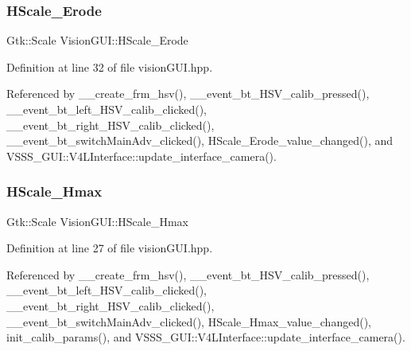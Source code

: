 \mbox{\label{class_vision_g_u_i_ad4bc77416f4e50fa03a7cc7f64a2d78e}} 
\subsubsection{\texorpdfstring{H\+Scale\+\_\+\+Erode}{HScale\_Erode}}
{\footnotesize\ttfamily Gtk\+::\+Scale Vision\+G\+U\+I\+::\+H\+Scale\+\_\+\+Erode}



Definition at line 32 of file vision\+G\+U\+I.\+hpp.



Referenced by \+\_\+\+\_\+create\+\_\+frm\+\_\+hsv(), \+\_\+\+\_\+event\+\_\+bt\+\_\+\+H\+S\+V\+\_\+calib\+\_\+pressed(), \+\_\+\+\_\+event\+\_\+bt\+\_\+left\+\_\+\+H\+S\+V\+\_\+calib\+\_\+clicked(), \+\_\+\+\_\+event\+\_\+bt\+\_\+right\+\_\+\+H\+S\+V\+\_\+calib\+\_\+clicked(), \+\_\+\+\_\+event\+\_\+bt\+\_\+switch\+Main\+Adv\+\_\+clicked(), H\+Scale\+\_\+\+Erode\+\_\+value\+\_\+changed(), and V\+S\+S\+S\+\_\+\+G\+U\+I\+::\+V4\+L\+Interface\+::update\+\_\+interface\+\_\+camera().

\mbox{\label{class_vision_g_u_i_a0b1bb9b8a70bd1f93427f71d0e885313}} 
\subsubsection{\texorpdfstring{H\+Scale\+\_\+\+Hmax}{HScale\_Hmax}}
{\footnotesize\ttfamily Gtk\+::\+Scale Vision\+G\+U\+I\+::\+H\+Scale\+\_\+\+Hmax}



Definition at line 27 of file vision\+G\+U\+I.\+hpp.



Referenced by \+\_\+\+\_\+create\+\_\+frm\+\_\+hsv(), \+\_\+\+\_\+event\+\_\+bt\+\_\+\+H\+S\+V\+\_\+calib\+\_\+pressed(), \+\_\+\+\_\+event\+\_\+bt\+\_\+left\+\_\+\+H\+S\+V\+\_\+calib\+\_\+clicked(), \+\_\+\+\_\+event\+\_\+bt\+\_\+right\+\_\+\+H\+S\+V\+\_\+calib\+\_\+clicked(), \+\_\+\+\_\+event\+\_\+bt\+\_\+switch\+Main\+Adv\+\_\+clicked(), H\+Scale\+\_\+\+Hmax\+\_\+value\+\_\+changed(), init\+\_\+calib\+\_\+params(), and V\+S\+S\+S\+\_\+\+G\+U\+I\+::\+V4\+L\+Interface\+::update\+\_\+interface\+\_\+camera().

